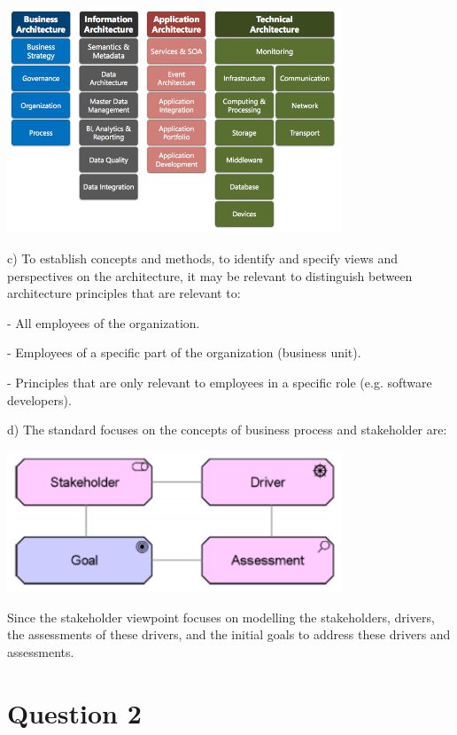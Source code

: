 \documentclass[a4paper,12pt]{texDoc}
\begin{document}
\begin{center}
\includegraphics[width=0.75\textwidth]{concepts.png}
\end{center}

c) To establish concepts and methods, to identify and specify views and perspectives on the architecture, it may be relevant to distinguish between architecture principles that are relevant to:

- All employees of the organization.

- Employees of a specific part of the organization (business unit).

- Principles that are only relevant to employees in a specific role (e.g. software developers).

d) The standard focuses on the concepts of business process and stakeholder are:

\begin{center}
\includegraphics[width=0.75\textwidth]{stakeholders.png}
\end{center}

Since the stakeholder viewpoint focuses on modelling the stakeholders, drivers, the assessments of these drivers, and the initial goals to address these drivers and assessments.

\section*{Question 2}
\end{document}
